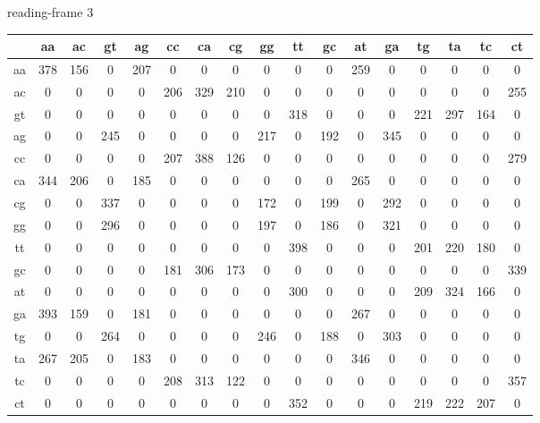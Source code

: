\documentclass{homework}
\begin{document}
\begin{enumerate}
\begin{enumerate}
\normalsize
reading-frame 3
\tiny

\begin{tabular}{c|cccccccccccccccc}
   & aa & ac & gt & ag & cc & ca & cg & gg & tt & gc & at & ga & tg & ta & tc & ct\\\hline
aa & 378 & 156 &   0 & 207 &   0 &   0 &   0 &   0 &   0 &   0 & 259 &   0 &   0 &   0 &   0 &   0\\
ac &   0 &   0 &   0 &   0 & 206 & 329 & 210 &   0 &   0 &   0 &   0 &   0 &   0 &   0 &   0 & 255\\
gt &   0 &   0 &   0 &   0 &   0 &   0 &   0 &   0 & 318 &   0 &   0 &   0 & 221 & 297 & 164 &   0\\
ag &   0 &   0 & 245 &   0 &   0 &   0 &   0 & 217 &   0 & 192 &   0 & 345 &   0 &   0 &   0 &   0\\
cc &   0 &   0 &   0 &   0 & 207 & 388 & 126 &   0 &   0 &   0 &   0 &   0 &   0 &   0 &   0 & 279\\
ca & 344 & 206 &   0 & 185 &   0 &   0 &   0 &   0 &   0 &   0 & 265 &   0 &   0 &   0 &   0 &   0\\
cg &   0 &   0 & 337 &   0 &   0 &   0 &   0 & 172 &   0 & 199 &   0 & 292 &   0 &   0 &   0 &   0\\
gg &   0 &   0 & 296 &   0 &   0 &   0 &   0 & 197 &   0 & 186 &   0 & 321 &   0 &   0 &   0 &   0\\
tt &   0 &   0 &   0 &   0 &   0 &   0 &   0 &   0 & 398 &   0 &   0 &   0 & 201 & 220 & 180 &   0\\
gc &   0 &   0 &   0 &   0 & 181 & 306 & 173 &   0 &   0 &   0 &   0 &   0 &   0 &   0 &   0 & 339\\
at &   0 &   0 &   0 &   0 &   0 &   0 &   0 &   0 & 300 &   0 &   0 &   0 & 209 & 324 & 166 &   0\\
ga & 393 & 159 &   0 & 181 &   0 &   0 &   0 &   0 &   0 &   0 & 267 &   0 &   0 &   0 &   0 &   0\\
tg &   0 &   0 & 264 &   0 &   0 &   0 &   0 & 246 &   0 & 188 &   0 & 303 &   0 &   0 &   0 &   0\\
ta & 267 & 205 &   0 & 183 &   0 &   0 &   0 &   0 &   0 &   0 & 346 &   0 &   0 &   0 &   0 &   0\\
tc &   0 &   0 &   0 &   0 & 208 & 313 & 122 &   0 &   0 &   0 &   0 &   0 &   0 &   0 &   0 & 357\\
ct &   0 &   0 &   0 &   0 &   0 &   0 &   0 &   0 & 352 &   0 &   0 &   0 & 219 & 222 & 207 &   0\\
\end{tabular}


\end{enumerate}
\end{enumerate}
\end{document}
